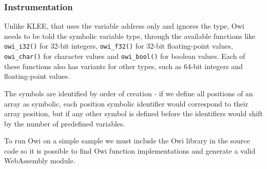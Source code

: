 \subsubsection{Instrumentation}\label{subsection:owi_instrumentation}


Unlike KLEE, that uses the variable address only and ignores the type, Owi needs to be told the symbolic variable type, through the available functions like \lstinline$owi_i32()$ for 32-bit integers, \lstinline$owi_f32()$ for 32-bit floating-point values, \lstinline$owi_char()$ for character values and \lstinline$owi_bool()$ for boolean values. Each of these functions also has variants for other types, such as 64-bit integers and floating-point values.


The symbols are identified by order of creation - if we define all positions of an array as symbolic, each position symbolic identifier would correspond to their array position, but if any other symbol is defined before the identifiers would shift by the number of predefined variables.

To run Owi on a simple sample we must include the Owi library in the source code so it is possible to find Owi function implementations and generate a valid WebAssembly module.

